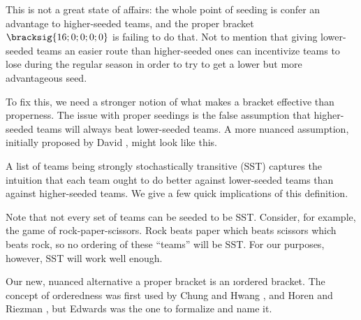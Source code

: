 {    This is not a great state of affairs: the whole point of seeding is confer an advantage to higher-seeded teams, and the proper bracket $\bracksig{16; 0; 0; 0; 0}$ is failing to do that. Not to mention that giving lower-seeded teams an easier route than higher-seeded ones can incentivize teams to lose during the regular season in order to try to get a lower but more advantageous seed.

    To fix this, we need a stronger notion of what makes a bracket effective than properness. The issue with proper seedings is the false assumption that higher-seeded teams will always beat lower-seeded teams. A more nuanced assumption, initially proposed by David \cite{stochastic}, might look like this.


    A list of teams being strongly stochastically transitive (SST) captures the intuition that each team ought to do better against lower-seeded teams than against higher-seeded teams. We give a few quick implications of this definition.


    Note that not every set of teams can be seeded to be SST. Consider, for example, the game of rock-paper-scissors. Rock beats paper which beats scissors which beats rock, so no ordering of these ``teams'' will be SST. For our purposes, however, SST will work well enough.

    Our new, nuanced alternative a proper bracket is an \i{ordered bracket}. The concept of orderedness was first used by Chung and Hwang \cite{define_ordered}, and Horen and Riezman \cite{four_eight_ordered}, but Edwards \cite{montana} was the one to formalize and name it.

}
